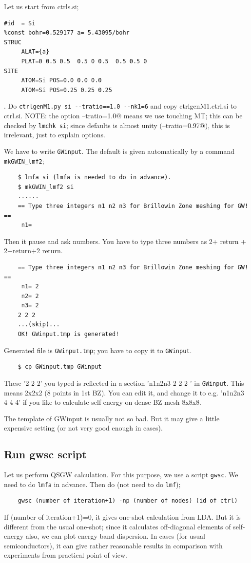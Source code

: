 \documentclass[a4paper,10pt,epsf,fleqn]{article}
\begin{document}
Let us start from ctrls.si;
\begin{verbatim}
#id  = Si
%const bohr=0.529177 a= 5.43095/bohr
STRUC
     ALAT={a} 
     PLAT=0 0.5 0.5  0.5 0 0.5  0.5 0.5 0 
SITE
     ATOM=Si POS=0.0 0.0 0.0
     ATOM=Si POS=0.25 0.25 0.25
\end{verbatim}
. Do \verb+ctrlgenM1.py si --tratio==1.0 --nk1=6+ and copy ctrlgenM1.ctrl.si to
ctrl.si. {\small NOTE: the option \verb@--tratio=1.0@ means we use touching MT; 
this can be checked by \verb+lmchk si+; since defaults is almost unity 
(\verb@--tratio=0.97@), this is irrelevant, just to explain options.} 

We have to write \verb+GWinput+. The default is given automatically by a
command \verb+mkGWIN_lmf2+;
\begin{verbatim}
    $ lmfa si (lmfa is needed to do in advance).
    $ mkGWIN_lmf2 si
    ......
    == Type three integers n1 n2 n3 for Brillowin Zone meshing for GW! ==
     n1=
\end{verbatim}
Then it pause and ask numbers. You have to type three numbers as
2+ return + 2+return+2 return.
\begin{verbatim}
    == Type three integers n1 n2 n3 for Brillowin Zone meshing for GW! ==
     n1= 2
     n2= 2
     n3= 2
    2 2 2
    ...(skip)...
    OK! GWinput.tmp is generated!
\end{verbatim}
Generated file is \verb+GWinput.tmp+; you have to copy it to \verb+GWinput+.
\begin{verbatim}
    $ cp GWinput.tmp GWinput
\end{verbatim}
These '2 2 2' you typed is reflected in a section 'n1n2n3 2 2 2 ' in
\verb+GWinput+. This means 2x2x2 (8 points in 1st BZ). 
You can edit it, and change it to e.g. 'n1n2n3 4 4 4' if you like to
calculate self-energy on dense BZ mesh 8x8x8. 

The template of GWinput is usually not so bad. But 
it may give a little expensive setting (or not very good enough in cases).


\subsection{Run gwsc script}
\label{fpgw-calc}
Let us perform QSGW calculation. 
For this purpose, we use a script \verb+gwsc+. 
We need to do \verb+lmfa+ in advance. Then do (not need to do \verb+lmf+);
\begin{verbatim}
    gwsc (number of iteration+1) -np (number of nodes) (id of ctrl)
\end{verbatim}
If (number of iteration+1)=0, it gives one-shot calculation from LDA.
But it is different from the usual one-shot;
since it calculates off-diagonal elements of self-energy also,
we can plot energy band dispersion. In cases (for usual
semiconductors), it can give rather reasonable results in comparison with
experiments from practical point of view.
\end{document}

